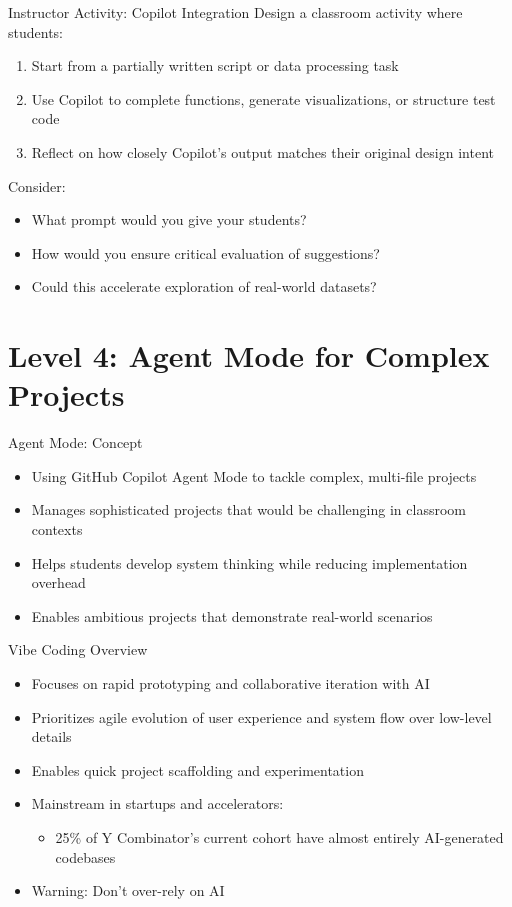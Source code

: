 \documentclass[xcolor=dvipsnames, aspectratio=169]{beamer}
\begin{document}
\begin{frame}{Instructor Activity: Copilot Integration}
  Design a classroom activity where students:
  \begin{enumerate}
    \item Start from a partially written script or data processing task
    \item Use Copilot to complete functions, generate visualizations, or structure test code
    \item Reflect on how closely Copilot's output matches their original design intent
  \end{enumerate}
  
  Consider:
  \begin{itemize}
    \item What prompt would you give your students?
    \item How would you ensure critical evaluation of suggestions?
    \item Could this accelerate exploration of real-world datasets?
  \end{itemize}
\end{frame}

\section{Level 4: Agent Mode for Complex Projects}

\begin{frame}{Agent Mode: Concept}
  \begin{itemize}
    \item Using GitHub Copilot Agent Mode to tackle complex, multi-file projects
    \item Manages sophisticated projects that would be challenging in classroom contexts
    \item Helps students develop system thinking while reducing implementation overhead
    \item Enables ambitious projects that demonstrate real-world scenarios
  \end{itemize}
\end{frame}

\begin{frame}{Vibe Coding Overview}
  \begin{itemize}
    \item Focuses on rapid prototyping and collaborative iteration with AI
    \item Prioritizes agile evolution of user experience and system flow over low-level details
    \item Enables quick project scaffolding and experimentation
    \item Mainstream in startups and accelerators:
      \begin{itemize}
        \item 25\% of Y Combinator's current cohort have almost entirely AI-generated codebases
      \end{itemize}
    \item Warning: Don't over-rely on AI
  \end{itemize}
\end{frame}
\end{document}
